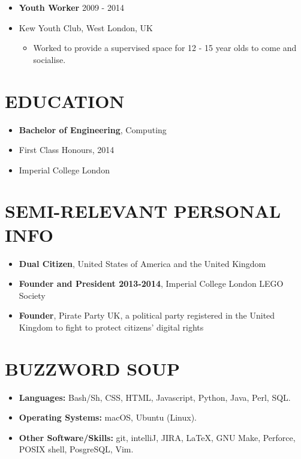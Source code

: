\documentclass[line,margin]{res}
\newcommand\oindent{0em}
\newcommand\lindent{1.5em}
\newcommand\si{\item[]}
\newenvironment{secretlist}[1]{\begin{itemize}[noitemsep,leftmargin=#1,nolistsep]}{\end{itemize}}
\begin{document}
\begin{resume}
\begin{secretlist}{\oindent}
\begin{secretlist}{\lindent}
                \end{secretlist}
            \end{secretlist}
            \vspace{0.6em}
            \begin{secretlist}{\oindent}
                \si \textbf{Youth Worker} \hfill 2009 - 2014
                \si Kew Youth Club, West London, UK
                \begin{secretlist}{\lindent}
                    \si Worked to provide a supervised space for 12 - 15 year olds to come and socialise.
                \end{secretlist}
            \end{secretlist}

        \section{EDUCATION}
            \begin{secretlist}{\oindent}
                \si \textbf{Bachelor of Engineering}, Computing
                \si First Class Honours, 2014
                \si Imperial College London
            \end{secretlist}

        \section{SEMI-RELEVANT PERSONAL INFO}
            \begin{secretlist}{\oindent}
                \si \textbf{Dual Citizen}, United States of America and the United Kingdom
                \si \textbf{Founder and President 2013-2014}, Imperial College London LEGO Society
                \si \textbf{Founder}, Pirate Party UK, a political party registered in the United Kingdom to fight to protect citizens' digital rights
            \end{secretlist}

        \section{BUZZWORD SOUP}
            \begin{secretlist}{\oindent}
                \si \textbf{Languages:} Bash/Sh, CSS, HTML, Javascript, Python, Java, Perl, SQL.
                \si \textbf{Operating Systems:} macOS, Ubuntu (Linux).
                \si \textbf{Other Software/Skills:} git, intelliJ, JIRA, \LaTeX, GNU Make, Perforce, POSIX shell, PosgreSQL, Vim.
            \end{secretlist}
    \end{resume}
\end{document}
